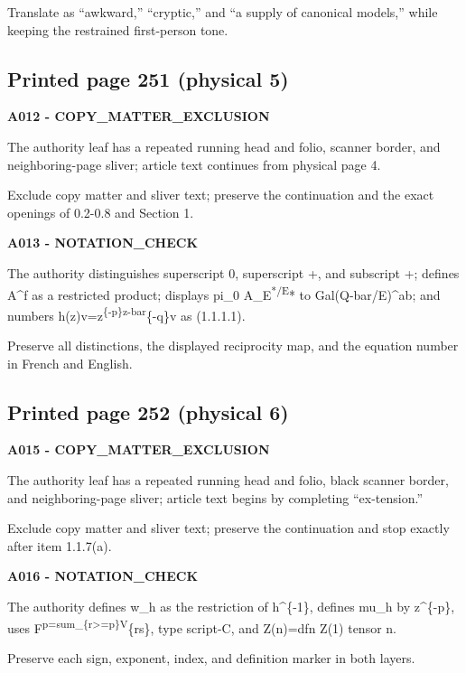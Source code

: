 \documentclass[10pt,a4paper]{article}
\begin{document}
Translate as ``awkward,'' ``cryptic,'' and ``a supply of canonical models,'' while keeping the restrained first-person tone.

\subsection{Printed page 251 (physical 5)}

\textbf{A012 - COPY\_MATTER\_EXCLUSION}

The authority leaf has a repeated running head and folio, scanner border, and neighboring-page sliver; article text continues from physical page 4.

Exclude copy matter and sliver text; preserve the continuation and the exact openings of 0.2-0.8 and Section 1.

\textbf{A013 - NOTATION\_CHECK}

The authority distinguishes superscript 0, superscript +, and subscript +; defines A\^{}f as a restricted product; displays pi\_0 A\_E\textsuperscript{*/E}* to Gal(Q-bar/E)\^{}ab; and numbers h(z)v=z\textsuperscript{\{-p\}z-bar}\{-q\}v as (1.1.1.1).

Preserve all distinctions, the displayed reciprocity map, and the equation number in French and English.

\subsection{Printed page 252 (physical 6)}

\textbf{A015 - COPY\_MATTER\_EXCLUSION}

The authority leaf has a repeated running head and folio, black scanner border, and neighboring-page sliver; article text begins by completing ``ex-tension.''

Exclude copy matter and sliver text; preserve the continuation and stop exactly after item 1.1.7(a).

\textbf{A016 - NOTATION\_CHECK}

The authority defines w\_h as the restriction of h\^{}\{-1\}, defines mu\_h by z\^{}\{-p\}, uses F\textsuperscript{p=sum\_\{r\textgreater=p\}V}\{rs\}, type script-C, and Z(n)=dfn Z(1) tensor n.

Preserve each sign, exponent, index, and definition marker in both layers.

\end{document}
